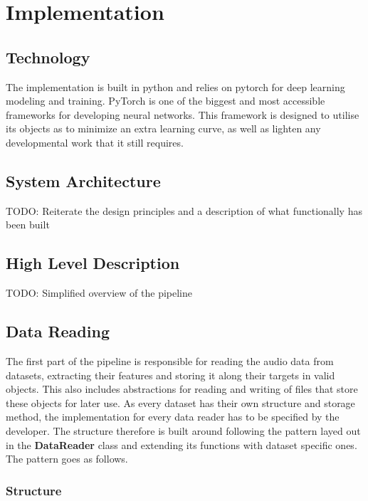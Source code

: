 \chapter{Implementation}

\section{Technology}

The implementation is built in python and relies on pytorch for deep learning modeling and training. PyTorch is one of the biggest and most accessible frameworks for developing neural networks. This framework is designed to utilise its objects as to minimize an extra learning curve, as well as lighten any developmental work that it still requires. 

\section{System Architecture}

TODO: Reiterate the design principles and a description of what functionally has been built

\section{High Level Description}

TODO: Simplified overview of the pipeline

\section{Data Reading} \label{Impl:DataRead}


The first part of the pipeline is responsible for reading the audio data from datasets, extracting their features and storing it along their targets in valid objects. This also includes abstractions for reading and writing of files that store these objects for later use. As every dataset has their own structure and storage method, the implementation for every data reader has to be specified by the developer. The structure therefore is built around following the pattern layed out in the \textbf{DataReader} class and extending its functions with dataset specific ones. The pattern goes as follows. \\

\subsection{Structure} \label{Impl:DataRead:Structure}

